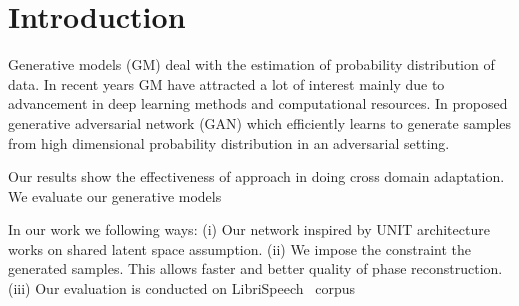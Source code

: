 \chapter{Introduction}
\label{ch:introduction}



Generative models (GM) deal with the estimation of probability distribution of data. In recent years GM have attracted a lot of interest mainly due to advancement in deep learning methods and computational resources. In \cite{goodfellow2014generative} proposed generative adversarial network (GAN) which efficiently learns to generate samples from high dimensional probability distribution in an adversarial setting. 


Our results show the effectiveness of approach in doing cross domain adaptation. We evaluate our generative models


In our work we  following ways: (i) Our network inspired by UNIT architecture works on shared latent space assumption. (ii) We impose the constraint the generated samples. This allows faster and better quality of phase reconstruction. (iii) Our evaluation is conducted on LibriSpeech~\cite{} corpus